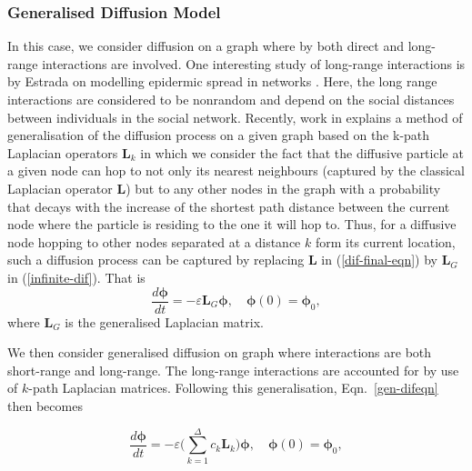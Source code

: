 \documentclass[10pt,a4paper]{article}
\begin{document}
        \subsubsection{Generalised Diffusion Model}
        In this case, we consider diffusion on a graph where by both direct and long-range interactions are involved. One interesting study of long-range interactions is by Estrada on modelling epidermic spread in networks \citep{estrada2011epidemic}. Here, the long range interactions are considered to be nonrandom and depend on the social distances between individuals in the social network.
        Recently, work in \citep{estrada2012path} explains a method of generalisation of the diffusion process on a given graph based on the k-path Laplacian operators $\mathbf{L}_k$ in which we consider the fact that the diffusive particle at a given node can hop to not only its nearest neighbours (captured by the classical Laplacian operator $\mathbf{L}$) but to any other nodes in the graph with a probability that decays with the increase of the shortest path distance between the current node where the particle is residing to the one it will hop to. Thus, for a diffusive node hopping to other nodes separated at a distance $k$ form its current location, such a diffusion process can be captured by replacing $\mathbf{L}$ in (\ref{dif-final-eqn}) by $\mathbf{L}_G$ in (\ref{infinite-dif}). That is 
        \begin{equation}
        \frac{d\boldsymbol{\phi}}{dt} = -\varepsilon \mathbf{L}_{G}\boldsymbol{\phi}, \quad \boldsymbol{\phi}(0) = \boldsymbol{\phi}_0 ,
        \label{gen-difeqn}
        \end{equation}
        where $\mathbf{L}_G$ is the generalised Laplacian matrix. 
        
        
        We then consider generalised diffusion on graph where interactions are both short-range and long-range. The long-range interactions are accounted for by use of $k$-path Laplacian matrices. Following this generalisation, Eqn.~\ref{gen-difeqn} then becomes
        
        \begin{equation}
        \frac{d\boldsymbol{\phi}}{dt} =  -\varepsilon \Big(\sum_{k=1}^{\Delta}c_k\mathbf{L}_{k} \Big) \boldsymbol{\phi}, \quad \boldsymbol{\phi}(0) = \boldsymbol{\phi}_0 ,
        \label{kgen-difeqn}
        \end{equation}
        
\end{document}
